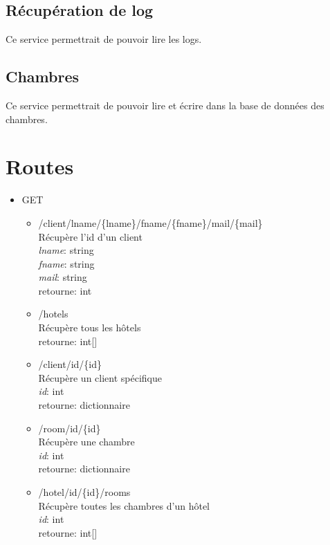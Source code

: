 \documentclass{article}
\begin{document}
\subsection{R\'ecup\'eration de log}
Ce service permettrait de pouvoir lire les logs.

\subsection{Chambres}
Ce service permettrait de pouvoir lire et \'ecrire dans la base de donn\'ees des chambres.


\pagebreak
\section{Routes}
\begin{itemize}


	\item GET
	\begin{itemize}
	\item /client/lname/\{lname\}/fname/\{fname\}/mail/\{mail\}\\
		R\'ecup\`ere l'id d'un client \\
		\textit{lname}: string \\
		\textit{fname}: string \\
		\textit{mail}: string \\
		retourne: int

	\item /hotels\\
		R\'ecup\`ere tous les h\^{o}tels \\
		retourne: int[]


	\item /client/id/\{id\}\\
		R\'ecup\`ere un client sp\'ecifique \\
		\textit{id}: int \\
		retourne: dictionnaire


	\item /room/id/\{id\}\\
		R\'ecup\`ere une chambre\\
		\textit{id}: int \\
		retourne: dictionnaire


	\item /hotel/id/\{id\}/rooms\\
		R\'ecup\`ere toutes les chambres d'un h\^{o}tel\\
		\textit{id}: int \\
		retourne: int[]



\end{itemize}
\end{itemize}
\end{document}
